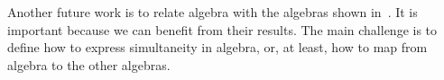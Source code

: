 Another future work is to relate \ac{algebra} with the algebras shown in~\cite{Merle2010,Walker2009}.
It is important because we can benefit from their results.
The main challenge is to define how to express simultaneity in \ac{algebra}, or, at least, how to map from \ac{algebra} to the other algebras.








